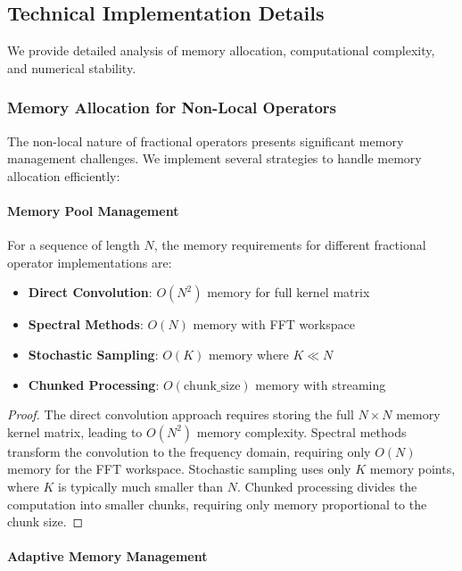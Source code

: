 \subsection{Technical Implementation Details}

We provide detailed analysis of memory allocation, computational complexity, and numerical stability.

\subsubsection{Memory Allocation for Non-Local Operators}

The non-local nature of fractional operators presents significant memory management challenges. We implement several strategies to handle memory allocation efficiently:

\paragraph{Memory Pool Management}

\begin{theorem}
For a sequence of length $N$, the memory requirements for different fractional operator implementations are:
\begin{itemize}
\item \textbf{Direct Convolution}: $O(N^2)$ memory for full kernel matrix
\item \textbf{Spectral Methods}: $O(N)$ memory with FFT workspace
\item \textbf{Stochastic Sampling}: $O(K)$ memory where $K \ll N$
\item \textbf{Chunked Processing}: $O(\text{chunk\_size})$ memory with streaming
\end{itemize}
\end{theorem}

\begin{proof}
The direct convolution approach requires storing the full $N \times N$ memory kernel matrix, leading to $O(N^2)$ memory complexity. Spectral methods transform the convolution to the frequency domain, requiring only $O(N)$ memory for the FFT workspace. Stochastic sampling uses only $K$ memory points, where $K$ is typically much smaller than $N$. Chunked processing divides the computation into smaller chunks, requiring only memory proportional to the chunk size.
\end{proof}

\paragraph{Adaptive Memory Management}

